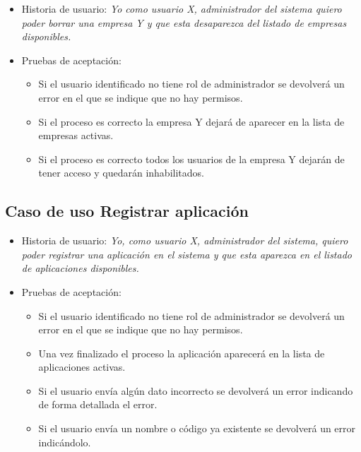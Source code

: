 \documentclass[12pt,a4paperpaper,]{report}
\providecommand{\tightlist}{%
  \setlength{\itemsep}{0pt}\setlength{\parskip}{0pt}}
\begin{document}
\begin{itemize}
\tightlist
\item
  Historia de usuario: \emph{Yo como usuario X, administrador del
  sistema quiero poder borrar una empresa Y y que esta desaparezca del
  listado de empresas disponibles.}
\item
  Pruebas de aceptación:

  \begin{itemize}
  \tightlist
  \item
    Si el usuario identificado no tiene rol de administrador se
    devolverá un error en el que se indique que no hay permisos.
  \item
    Si el proceso es correcto la empresa Y dejará de aparecer en la
    lista de empresas activas.
  \item
    Si el proceso es correcto todos los usuarios de la empresa Y dejarán
    de tener acceso y quedarán inhabilitados.
  \end{itemize}
\end{itemize}

\subsection{Caso de uso Registrar
aplicación}\label{caso-de-uso-registrar-aplicaciuxf3n-1}

\begin{itemize}
\tightlist
\item
  Historia de usuario: \emph{Yo, como usuario X, administrador del
  sistema, quiero poder registrar una aplicación en el sistema y que
  esta aparezca en el listado de aplicaciones disponibles.}
\item
  Pruebas de aceptación:

  \begin{itemize}
  \tightlist
  \item
    Si el usuario identificado no tiene rol de administrador se
    devolverá un error en el que se indique que no hay permisos.
  \item
    Una vez finalizado el proceso la aplicación aparecerá en la lista de
    aplicaciones activas.
  \item
    Si el usuario envía algún dato incorrecto se devolverá un error
    indicando de forma detallada el error.
  \item
    Si el usuario envía un nombre o código ya existente se devolverá un
    error indicándolo.
  \end{itemize}
\end{itemize}
\end{document}
